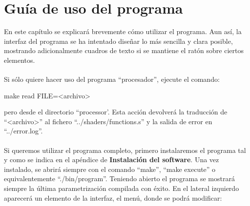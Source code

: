 
\chapter{Guía de uso del programa}\label{ap:apendice2}

En este capítulo se explicará brevemente cómo utilizar el programa. Aun así, la interfaz del programa se ha intentado diseñar lo más sencilla y clara posible, mostrando adicionalmente cuadros de texto si se mantiene el ratón sobre ciertos elementos.\\
\\Si sólo quiere hacer uso del programa ``procesador'', ejecute el comando:
\begin{center}
 make read FILE=<archivo>
\end{center}
pero desde el directorio ``processor'. Esta acción devolverá la traducción de ``<archivo>'' al fichero ``../shaders/functions.s'' y la salida de error en ``../error.log''.\\
\\Si queremos utilizar el programa completo, primero instalaremos el programa tal y como se indica en el apéndice de \textbf{Instalación del software}. Una vez instalado, se abrirá siempre con el comando ``make'', ``make execute'' o equivalentemente ``./bin/program''. Teniendo abierto el programa se mostrará siempre la última parametrización compilada con éxito. En el lateral izquierdo aparecerá un elemento de la interfaz, el menú, donde se podrá modificar:
